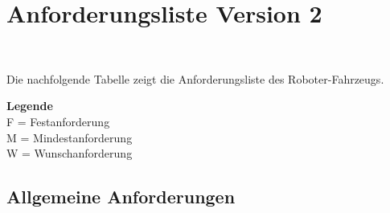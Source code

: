 \documentclass[main.tex]{subfiles} %
\begin{document}

\section{Anforderungsliste Version 2}~\label{appendix:Greifereinheit}

Die nachfolgende Tabelle zeigt die Anforderungsliste des Roboter-Fahrzeugs.

\textbf{Legende} \\ F = Festanforderung \\ M = Mindestanforderung \\ W = Wunschanforderung

\subsection*{Allgemeine Anforderungen}
\end{document}

